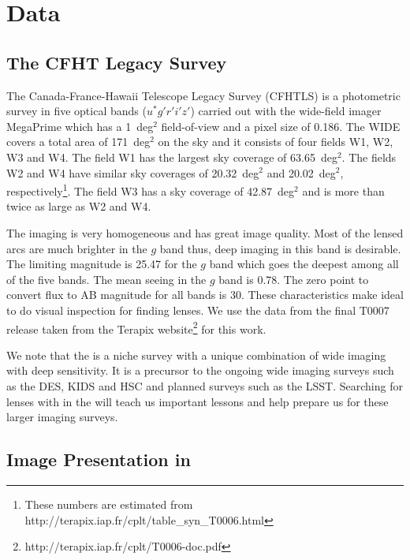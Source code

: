 \documentclass[useAMS,usenatbib,a4paper]{mn2e}
\begin{document}

\section{Data}
\label{sec:data}
\subsection{The CFHT Legacy Survey}
\label{sec:data:cfhtls}

The Canada-France-Hawaii Telescope Legacy Survey (CFHTLS) is a
photometric survey in five optical bands ($u^*g'r'i'z'$) carried out
with the wide-field imager MegaPrime which has a 1~deg$^2$ field-of-view
and a pixel size of 0.186\arcsec. The \cfhtls \textsc{WIDE} covers a total area
of 171~deg$^2$ on the sky and it consists of four fields W1, W2, W3 and
W4. The field W1 has the largest sky coverage of 63.65~deg$^2$. The
fields W2 and W4 have similar sky coverages of 20.32~deg$^2$ and
20.02~deg$^2$, respectively\footnote{These numbers are estimated from http://terapix.iap.fr/cplt/table\_syn\_T0006.html}.
The field W3 has a sky coverage of 42.87~deg$^2$ and is more than twice
as large as W2 and W4. 

The \cfhtls imaging is very homogeneous and has great image quality. Most of
the lensed arcs are much brighter in the $g$ band thus, deep imaging in
this band is desirable. The limiting magnitude is 25.47 for the $g$ band
which goes the deepest among all of the five bands. The mean seeing in
the $g$ band is 0.78\arcsec. The zero point to convert flux to AB
magnitude for all bands is 30. These characteristics make \cfhtls ideal
to do visual inspection for finding lenses.  We use the data from the
final T0007 release taken from the Terapix
website\footnote{{http://terapix.iap.fr/cplt/T0006-doc.pdf}}
for this work.

We note that the \cfhtls is a niche survey with a unique combination of
wide imaging with deep sensitivity. It is a precursor to the ongoing
wide imaging surveys such as the DES, KIDS and HSC and planned surveys
such as the LSST. Searching for lenses with \sw in the \cfhtls will
teach us important lessons and help prepare us for these larger imaging
surveys.



\subsection{Image Presentation in \sw}
\label{sec:data:impres}
\end{document}

